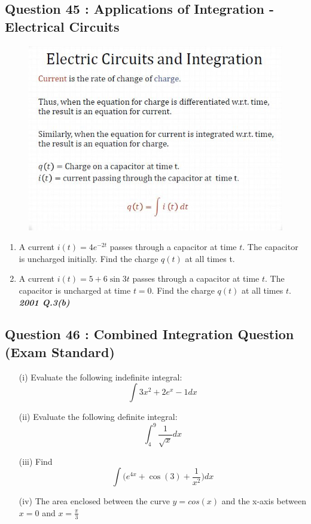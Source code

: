 \documentclass[]{article}
\begin{document}

\subsection*{Question 45 : Applications of Integration - Electrical Circuits}
\begin{figure}[h!]
	\centering
	\includegraphics[width=0.6\linewidth]{circuits}
	
\end{figure}

\begin{enumerate}
	\item A current $i(t) = 4e^{-2t}$
	passes through a capacitor at
	time $t$. The capacitor is
	uncharged initially. Find the
	charge $q(t)$ at all times t.
	\item 
	A current $i(t) = 5 + 6 \sin 3t$
	passes through a capacitor at
	time $t$.
	The capacitor is uncharged at
	time $t=0$. Find the charge
	$q(t)$ at all times $t$. \textbf{\textit{2001 Q.3(b)}}
\end{enumerate}

\subsection*{Question 46 : Combined Integration Question (Exam Standard)}

\begin{itemize}
	\item[(i)] 
	Evaluate the following indefinite integral: 
	\[\int 3x^2 +2e^x -1 dx\] 
	\item[(ii)] Evaluate the following definite integral: 
	\[\int^{9}_{4} \frac{1}{\sqrt{x}} dx\] 
	\item[(iii)] Find \[\int \bigg(e^{4x} + \cos(3) + \frac{1}{x^2} \bigg)dx\]
	
	\item[(iv)] The area enclosed between the curve $y=cos(x)$ and the x-axis between $x=0$ and $x= \frac{\pi}{3}$
\end{itemize}
\end{document}
